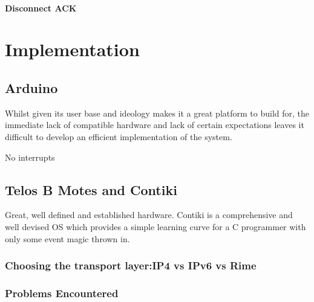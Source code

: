 \documentclass{l4proj}
\begin{document}

\subsubsection{Disconnect ACK} %
\label{ssub:disconnect_ack}











\chapter{Implementation} %
\label{cha:implementation}

\section{Arduino} %
\label{sec:arduino}
Whilst given its user base and ideology makes it a great platform to build for, the immediate lack of compatible hardware and lack of certain expectations leaves it difficult to develop an efficient implementation of the system.

No interrupts


\section{Telos B Motes and Contiki} %
\label{sec:contiki}
Great, well defined and established hardware.
Contiki is a comprehensive and well devised OS which provides a simple learning curve for a C programmer with only some event magic thrown in.

\subsection{Choosing the transport layer:IP4 vs IPv6 vs Rime} %
\label{sub:ip4_vs_ipv6_vs_rime}


\subsection{Problems Encountered} %
\label{sub:problems_encountered}
\end{document}
